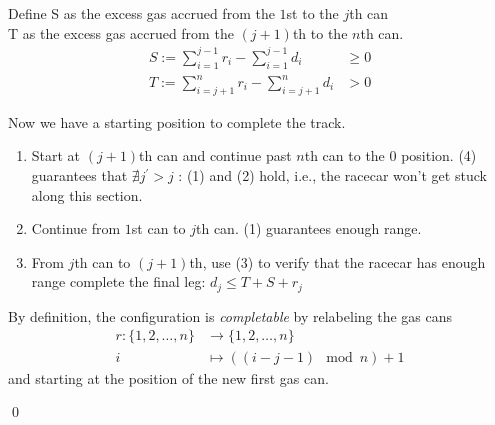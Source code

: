 \documentclass[a4paper,12pt]{article}
\begin{document}
\noindent Define S as the excess gas accrued from the $1$st to the $j$th can\\
\indent \qquad T as the excess gas accrued from the $(j+1)$th to the $n$th can.
\begin{align*}
S := \sum_{i=1}^{j-1} {r_i} - \sum_{i=1}^{j-1} {d_i} &\geq 0\\
T := \sum_{i=j+1}^{n} {r_i} - \sum_{i=j+1}^{n} {d_i} &> 0
\end{align*}

\noindent Now we have a starting position to complete the track.
\begin{enumerate}
	\item Start at $(j+1)$th can and continue past $n$th can to the 0 position. (4) guarantees that $\nexists j^\prime>j$ : (1) and (2) hold, i.e., the racecar won't get stuck along this section. 
	\item Continue from $1$st can to $j$th can. (1) guarantees enough range.
	\item From $j$th can to $(j+1)$th, use (3) to verify that the racecar has enough range complete the final leg: $d_j \leq T+S+r_j$
\end{enumerate}
By definition, the configuration is \emph{completable} by relabeling the gas cans
\begin{align*}
r: \{1,2,\ldots,n\} &\to \{1,2,\ldots,n\}\\
i &\mapsto ((i-j-1)\mod{n}) + 1
\end{align*}
and starting at the position of the new first gas can.

\qed
\end{document}
